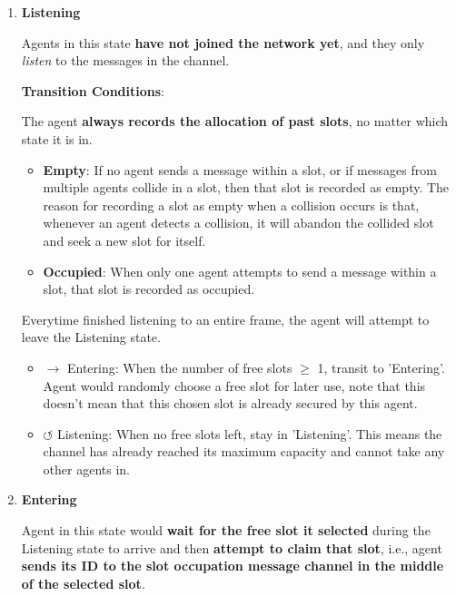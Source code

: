 \begin{enumerate}
    \item \textbf{Listening}
    
    Agents in this state \textbf{have not joined the network yet}, and they only \textit{listen} to the messages in the channel.

    \textbf{Transition Conditions}:
    
    
    The agent \textbf{always records the allocation of past slots}, no matter which state it is in.
    
    \begin{itemize}
        \item \textbf{Empty}: 
        If no agent sends a message within a slot, or if messages from multiple agents collide in a slot, then that slot is recorded as empty. The reason for recording a slot as empty when a collision occurs is that, whenever an agent detects a collision, it will abandon the collided slot and seek a new slot for itself. 
        \item \textbf{Occupied}: 
        When only one agent attempts to send a message within a slot, that slot is recorded as occupied.       
    \end{itemize}

    Everytime finished listening to an entire frame, the agent will attempt to leave the Listening state.
    
    \begin{itemize}
        \item $\rightarrow$ Entering: When the number of free slots $\geq$ 1, transit to 'Entering'. Agent would randomly choose a free slot for later use, note that this doesn't mean that this chosen slot is already secured by this agent.
        \item $\circlearrowleft$ Listening: When no free slots left, stay in 'Listening'. This means the channel has already reached its maximum capacity and cannot take any other agents in. 
    \end{itemize}

    \item \textbf{Entering}
    
    Agent in this state would \textbf{wait for the free slot it selected} during the Listening state to arrive and then \textbf{attempt to claim that slot}, i.e., agent \textbf{sends its ID to the slot occupation message channel in the middle of the selected slot}.


\end{enumerate}
